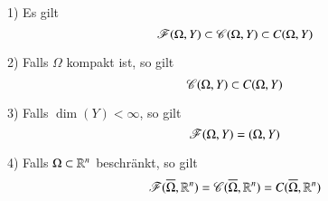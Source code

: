 \begin{remark}
    \begin{description}
        \item{1)}
        Es gilt
        \[
            \mathscr F(\Omega,Y)\subset \mathscr C(\Omega,Y)\subset C(\Omega,Y)
        \]
        \item{2)}
        Falls $\Omega$ kompakt ist, so gilt
        \[
            \mathscr C(\Omega,Y)\subset C(\Omega,Y)
        \]
        \item{3)}
        Falls $\dim(Y)<\infty$, so gilt
        \[
            \mathscr F(\Omega,Y)=\mathscr (\Omega,Y)
        \]
        \item{4)}
        Falls $\Omega\subset\mathbb{R}^n$ beschränkt, so gilt
        \[
            \mathscr F (\overline \Omega,\mathbb{R}^n)=\mathscr C(\overline \Omega,\mathbb{R}^n)=C(\overline\Omega,\mathbb{R}^n)
        \]
    \end{description}
\end{remark}
